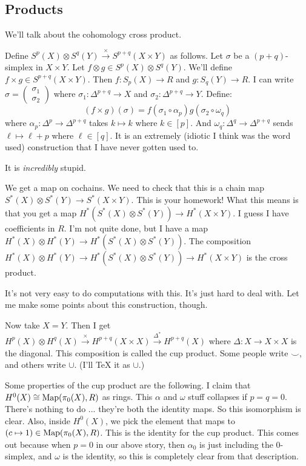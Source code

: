 \subsection{Products}
We'll talk about the cohomology cross product.
\begin{construction}
Define $S^p(X)\otimes S^q(Y)\xrightarrow{\times}S^{p+q}(X\times Y)$ as follows. Let $\sigma$ be a $(p+q)$-simplex in $X\times Y$. Let $f\otimes g\in S^p(X)\otimes S^q(Y)$. We'll define $f\times g\in S^{p+q}(X\times Y)$. Then $f:S_p(X)\to R$ and $g:S_q(Y)\to R$. I can write $\sigma=\begin{pmatrix}\sigma_1 \\ \sigma_2\end{pmatrix}$ where $\sigma_1:\Delta^{p+q}\to X$ and $\sigma_2:\Delta^{p+q}\to Y$. Define:
\begin{equation*}
(f\times g)(\sigma)=f(\sigma_1\circ\alpha_p)g(\sigma_2\circ\omega_q)
\end{equation*}
where $\alpha_p:\Delta^p\to\Delta^{p+q}$ takes $k\mapsto k$ where $k\in[p]$. And $\omega_q:\Delta^q\to\Delta^{p+q}$ sends $\ell\mapsto \ell+p$ where $\ell\in[q]$. It is an extremely (idiotic I think was the word used) construction that I have never gotten used to.
\begin{remark}
It is \emph{incredibly} stupid.
\end{remark}
We get a map on cochains. We need to check that this is a chain map $S^\ast(X)\otimes S^\ast(Y)\to S^\ast(X\times Y)$. This is your homework! What this means is that you get a map $ H^\ast(S^\ast(X)\otimes S^\ast(Y))\to H^\ast(X\times Y)$. I guess I have coefficients in $R$. I'm not quite done, but I have a map $ H^\ast(X)\otimes H^\ast(Y)\to H^\ast(S^\ast(X)\otimes S^\ast(Y))$. The composition $ H^\ast(X)\otimes H^\ast(Y)\to H^\ast(S^\ast(X)\otimes S^\ast(Y))\to H^\ast(X\times Y)$ is the cross product.
\end{construction}
It's not very easy to do computations with this. It's just hard to deal with. Let me make some points about this construction, though.
\begin{definition}
Now take $X=Y$. Then I get $ H^p(X)\otimes H^q(X)\xrightarrow{\times} H^{p+q}(X\times X)\xrightarrow{\Delta^\ast} H^{p+q}(X)$ where $\Delta:X\to X\times X$ is the diagonal. This composition is called the cup product. Some people write $\smile$, and others write $\cup$. (I'll TeX it as $\cup$.)
\end{definition}
Some properties of the cup product are the following. I claim that $ H^0(X)\cong\operatorname{Map}(\pi_0(X),R)$ as rings. This $\alpha$ and $\omega$ stuff collapses if $p=q=0$. There's nothing to do ... they're both the identity maps. So this isomorphism is clear. Also, inside $ H^0(X)$, we pick the element that maps to $(c\mapsto 1)\in\operatorname{Map}(\pi_0(X),R)$. This is the identity for the cup product. This comes out because when $p=0$ in our above story, then $\alpha_0$ is just including the $0$-simplex, and $\omega$ is the identity, so this is completely clear from that description.
